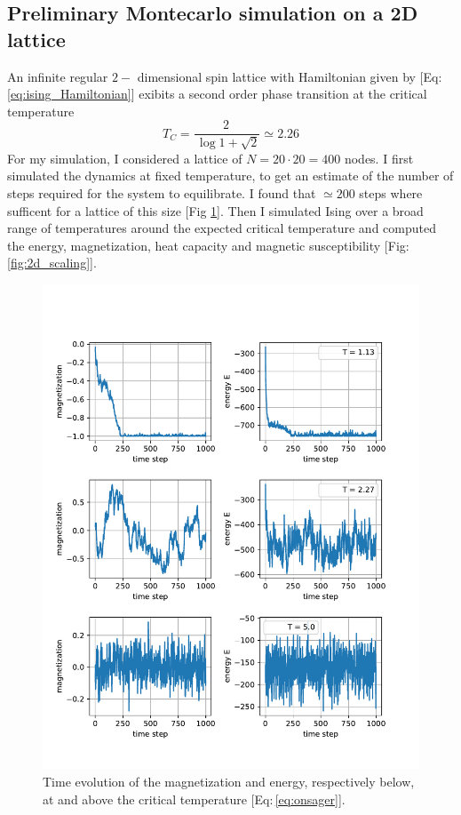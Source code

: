 {\subsection*{Preliminary Montecarlo simulation on a 2D lattice}
{\small
An infinite regular $2-$ dimensional spin lattice with Hamiltonian given by [Eq: \ref{eq:ising_Hamiltonian}] exibits a second order phase transition at the critical temperature 
\begin{equation}
T_C = \frac{2\,}{\,\log{1 + \sqrt{2}}} \simeq 2.26
    \label{eq:onsager}
  \end{equation}  
For my simulation, I considered a lattice of $N = 20 \cdot 20 = 400$ nodes. I first simulated the dynamics at fixed temperature, to get an estimate of the number of steps required for the system to equilibrate. I found that $\simeq 200$ steps where sufficent for a lattice of this size [Fig \ref{fig:2d_relaxation}]. Then I simulated Ising over a broad range of temperatures around the expected critical temperature and computed the energy, magnetization, heat capacity and magnetic susceptibility [Fig: \ref{fig:2d_scaling}].
}
\begin{figure}[H]
    \centering
    \includegraphics[width=0.8\linewidth]{latex_source/images/ising/2d_relaxation.pdf}
    \caption{{\small Time evolution of the magnetization and energy, respectively below, at and above the critical temperature [Eq:\,\ref{eq:onsager}].}}
    \label{fig:2d_relaxation}
\end{figure}

}
